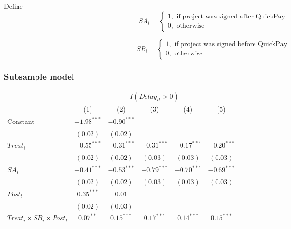\documentclass[
]{article}
\begin{document}
Define
\[ SA_i = \begin{cases} 1, \text{ if project was signed after QuickPay}\\
0, \text{ otherwise} \end{cases}\]

\[ SB_i = \begin{cases} 1, \text{ if project was signed before QuickPay}\\
0, \text{ otherwise} \end{cases}\]

\hypertarget{subsample-model}{%
\subsubsection{Subsample model}\label{subsample-model}}

\begin{table}
\begin{center}
\begin{tabular}{l c c c c c}
\hline
 & \multicolumn{5}{c}{$I(Delay_{it}>0)$} \\
\cline{2-6}
 & (1) & (2) & (3) & (4) & (5) \\
\hline
Constant                                   & $-1.98^{***}$ & $-0.90^{***}$ &               &               &               \\
                                           & $(0.02)$      & $(0.02)$      &               &               &               \\
$Treat_i$                                  & $-0.55^{***}$ & $-0.31^{***}$ & $-0.31^{***}$ & $-0.17^{***}$ & $-0.20^{***}$ \\
                                           & $(0.02)$      & $(0.02)$      & $(0.03)$      & $(0.03)$      & $(0.03)$      \\
$SA_i$                                     & $-0.41^{***}$ & $-0.53^{***}$ & $-0.79^{***}$ & $-0.70^{***}$ & $-0.69^{***}$ \\
                                           & $(0.02)$      & $(0.02)$      & $(0.03)$      & $(0.03)$      & $(0.03)$      \\
$Post_t$                                   & $0.35^{***}$  & $0.01$        &               &               &               \\
                                           & $(0.02)$      & $(0.03)$      &               &               &               \\
$Treat_i \times SB_i \times Post_t$        & $0.07^{**}$   & $0.15^{***}$  & $0.17^{***}$  & $0.14^{***}$  & $0.15^{***}$  \\

\end{tabular}
\end{center}
\end{table}
\end{document}
